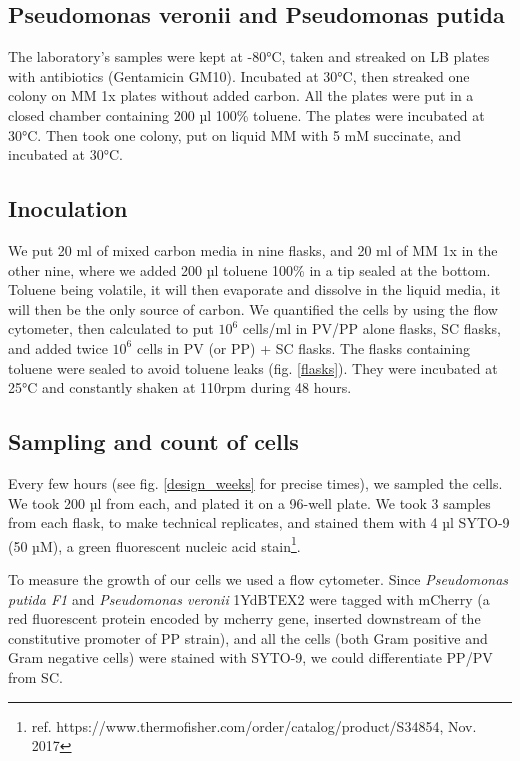 \documentclass[a4paper, 10pt, conference]{ieeeconf}   %
\begin{document}
\subsection{Pseudomonas veronii and Pseudomonas putida}
The laboratory's samples were kept at -80°C, taken and streaked on LB plates with antibiotics (Gentamicin GM10). Incubated at 30°C, then streaked one colony on MM 1x plates without added carbon. All the plates were put in a closed chamber containing 200 µl 100\% toluene. The plates were incubated at 30°C. Then took one colony, put on liquid MM with 5 mM succinate, and incubated at 30°C.

\subsection{Inoculation}
We put 20 ml of mixed carbon media in nine flasks, and 20 ml of MM 1x in the other nine, where we added 200 µl toluene 100\% in a tip sealed at the bottom. Toluene being volatile, it will then evaporate and dissolve in the liquid media, it will then be the only source of carbon. We quantified the cells by using the flow cytometer, then calculated to put $10^{6}$ cells/ml in PV/PP alone flasks, SC flasks, and added twice $10^{6}$ cells in PV (or PP) + SC flasks. The flasks containing toluene were sealed to avoid toluene leaks (fig. \ref{flasks}).
They were incubated at 25°C and constantly shaken at 110rpm during 48 hours.

\subsection{Sampling and count of cells}
Every few hours (see fig. \ref{design_weeks} for precise times), we sampled the cells. We took 200 µl from each, and plated it on a 96-well plate. We took 3 samples from each flask, to make technical replicates, and stained them with 4 µl SYTO-9 (50 µM), a  green fluorescent nucleic acid stain\footnote{ref. https://www.thermofisher.com/order/catalog/product/S34854, Nov. 2017}. 

To measure the growth of our cells we used a flow cytometer. 
Since \textit{Pseudomonas putida F1} and \textit{Pseudomonas veronii} 1YdBTEX2 were tagged with mCherry (a red fluorescent protein encoded by mcherry gene, inserted downstream of the constitutive promoter of PP strain), and all the cells (both Gram positive and Gram negative cells) were stained with SYTO-9, we could differentiate PP/PV from SC. 
%  
\end{document}
